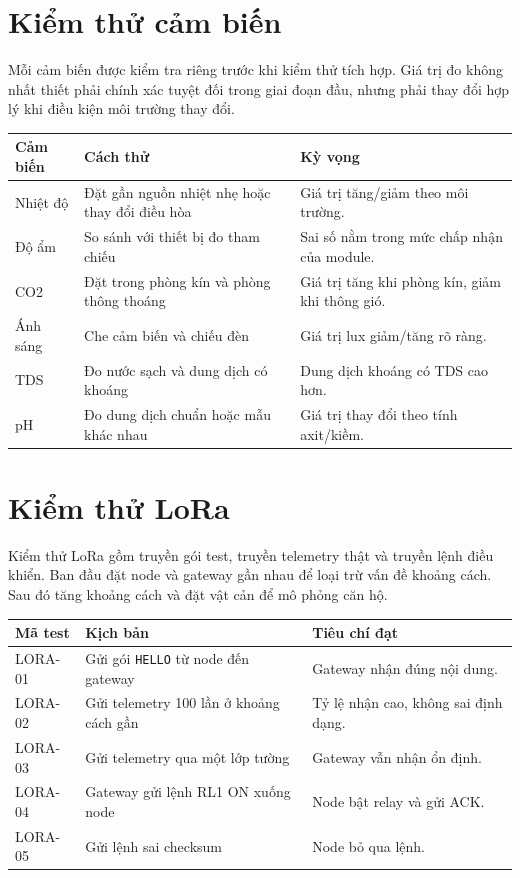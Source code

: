 \section{Kiểm thử cảm biến}
Mỗi cảm biến được kiểm tra riêng trước khi kiểm thử tích hợp. Giá trị đo không nhất thiết phải chính xác tuyệt đối trong giai đoạn đầu, nhưng phải thay đổi hợp lý khi điều kiện môi trường thay đổi.

\begin{longtable}{|p{2.8cm}|p{4.2cm}|p{5.8cm}|}
\hline
\textbf{Cảm biến} & \textbf{Cách thử} & \textbf{Kỳ vọng} \\
\hline
Nhiệt độ & Đặt gần nguồn nhiệt nhẹ hoặc thay đổi điều hòa & Giá trị tăng/giảm theo môi trường. \\
\hline
Độ ẩm & So sánh với thiết bị đo tham chiếu & Sai số nằm trong mức chấp nhận của module. \\
\hline
CO2 & Đặt trong phòng kín và phòng thông thoáng & Giá trị tăng khi phòng kín, giảm khi thông gió. \\
\hline
Ánh sáng & Che cảm biến và chiếu đèn & Giá trị lux giảm/tăng rõ ràng. \\
\hline
TDS & Đo nước sạch và dung dịch có khoáng & Dung dịch khoáng có TDS cao hơn. \\
\hline
pH & Đo dung dịch chuẩn hoặc mẫu khác nhau & Giá trị thay đổi theo tính axit/kiềm. \\
\hline
\end{longtable}

\section{Kiểm thử LoRa}
Kiểm thử LoRa gồm truyền gói test, truyền telemetry thật và truyền lệnh điều khiển. Ban đầu đặt node và gateway gần nhau để loại trừ vấn đề khoảng cách. Sau đó tăng khoảng cách và đặt vật cản để mô phỏng căn hộ.

\begin{longtable}{|p{2.8cm}|p{4.7cm}|p{5.3cm}|}
\hline
\textbf{Mã test} & \textbf{Kịch bản} & \textbf{Tiêu chí đạt} \\
\hline
LORA-01 & Gửi gói \texttt{HELLO} từ node đến gateway & Gateway nhận đúng nội dung. \\
\hline
LORA-02 & Gửi telemetry 100 lần ở khoảng cách gần & Tỷ lệ nhận cao, không sai định dạng. \\
\hline
LORA-03 & Gửi telemetry qua một lớp tường & Gateway vẫn nhận ổn định. \\
\hline
LORA-04 & Gateway gửi lệnh RL1 ON xuống node & Node bật relay và gửi ACK. \\
\hline
LORA-05 & Gửi lệnh sai checksum & Node bỏ qua lệnh. \\
\hline
\end{longtable}

